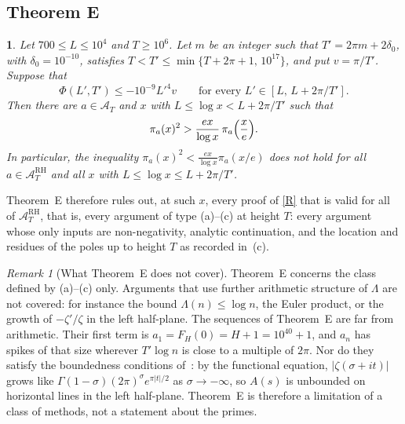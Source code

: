\documentclass{amsart}
\theoremstyle{definition}
\theoremstyle{remark}
\newtheorem{remark}[theorem]{Remark}
\theoremstyle{plain}
\newcommand{\lettername}{}
\newtheorem*{letteredthm*}{\lettername}
\newenvironment{lthm}[1]{\renewcommand{\lettername}{Theorem #1}\begin{letteredthm*}}{\end{letteredthm*}}
\numberwithin{equation}{section}
\newcommand{\cA}{\mathcal{A}}
\newcommand{\cARH}{\mathcal{A}^{\mathrm{RH}}}
\begin{document}
\subsection{Theorem E}

\begin{lthm}{E}
Let $700\le L\le10^4$ and $T\ge10^6$. Let $m$ be an integer such that $T'=2\pi m+2\delta_0$, with $\delta_0=10^{-10}$, satisfies $T<T'\le\min\{T+2\pi+1,\,10^{17}\}$, and put $v=\pi/T'$. Suppose that
\begin{equation}\label{eq:Ehyp}
\Phi(L',T')\le-10^{-9}L'^4v\qquad\text{for every }L'\in[L,\,L+2\pi/T'].
\end{equation}
Then there are $a\in\cA_T$ and $x$ with $L\le\log x<L+2\pi/T'$ such that
\[
\pi_a(x)^2>\frac{ex}{\log x}\,\pi_a\Bigl(\frac xe\Bigr).
\]
In particular, the inequality $\pi_a(x)^2<\frac{ex}{\log x}\pi_a(x/e)$ does not hold for all $a\in\cARH_T$ and all $x$ with $L\le\log x\le L+2\pi/T'$.
\end{lthm}

Theorem~E therefore rules out, at such $x$, every proof of \eqref{R} that is valid for all of $\cARH_T$, that is, every argument of type (a)--(c) at height $T$: every argument whose only inputs are non-negativity, analytic continuation, and the location and residues of the poles up to height $T$ as recorded in~(c).

\begin{remark}[What Theorem~E does not cover]\label{rem:Enot}
Theorem~E concerns the class defined by (a)--(c) only. Arguments that use further arithmetic structure of $\Lambda$ are not covered: for instance the bound $\Lambda(n)\le\log n$, the Euler product, or the growth of $-\zeta'/\zeta$ in the left half-plane. The sequences of Theorem~E are far from arithmetic. Their first term is $a_1=F_H(0)=H+1=10^{40}+1$, and $a_n$ has spikes of that size wherever $T'\log n$ is close to a multiple of $2\pi$. Nor do they satisfy the boundedness conditions of~\cite[Thm.~1.1]{CH25}: by the functional equation, $|\zeta(\sigma+it)|$ grows like $\Gamma(1-\sigma)(2\pi)^\sigma e^{\pi|t|/2}$ as $\sigma\to-\infty$, so $A(s)$ is unbounded on horizontal lines in the left half-plane. Theorem~E is therefore a limitation of a class of methods, not a statement about the primes.
\end{remark}
\end{document}
